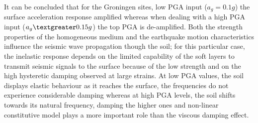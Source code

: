 	It can be concluded that for the Groningen sites, low PGA input ($a_g=0.1g$) the surface acceleration response amplified whereas when dealing with a high PGA input ($a_g\textgreater0.15g$) the top PGA is de-amplified. Both the strength properties of the homogeneous medium and the earthquake motion characteristics influence the seismic wave propagation though the soil; for this particular case, the inelastic response depends on the limited capability of the soft layers to transmit seismic signals to the surface because of the low strength and on the high hysteretic damping observed at large strains. At low PGA values, the soil displays elastic behaviour as it reaches the surface, the frequencies do not experience considerable damping whereas at high PGA levels, the soil shifts towards its natural frequency, damping the higher ones and non-linear constitutive model plays a more important role than the viscous damping effect.